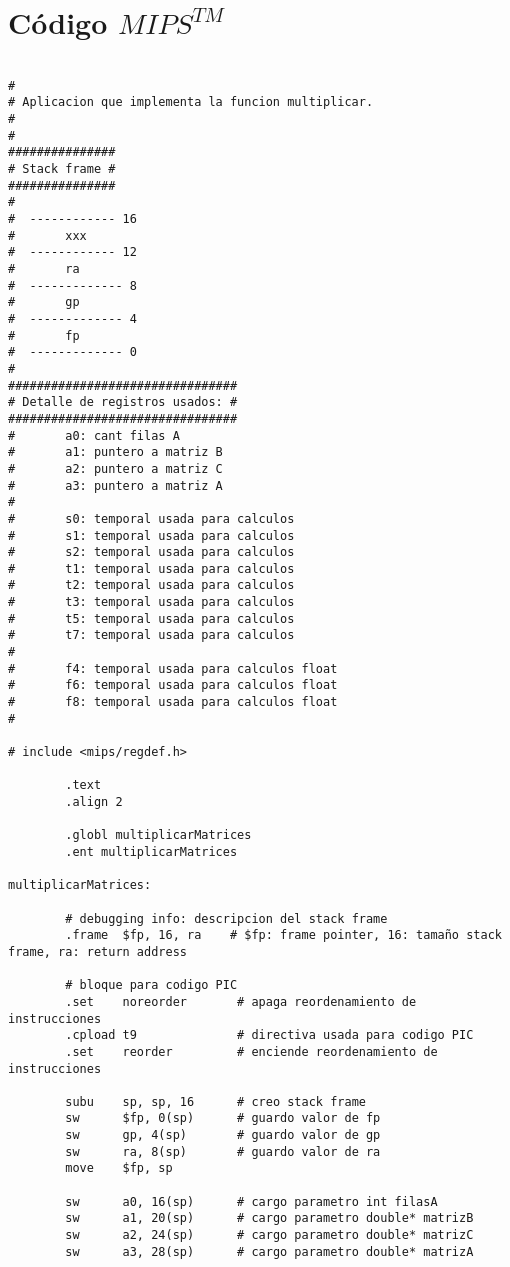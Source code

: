 \documentclass[a4paper,10pt]{article}
\begin{document}
\section{C\'odigo $MIPS^{TM}$}
\begin{lstlisting}

#
# Aplicacion que implementa la funcion multiplicar.
#
#
###############
# Stack frame #
###############
#
#  ------------ 16
#       xxx
#  ------------ 12
#       ra
#  ------------- 8
#       gp
#  ------------- 4
#       fp
#  ------------- 0
#
################################
# Detalle de registros usados: #
################################
#       a0: cant filas A
#       a1: puntero a matriz B
#       a2: puntero a matriz C
#       a3: puntero a matriz A
#
#       s0: temporal usada para calculos
#       s1: temporal usada para calculos
#       s2: temporal usada para calculos
#       t1: temporal usada para calculos
#       t2: temporal usada para calculos
#       t3: temporal usada para calculos
#       t5: temporal usada para calculos
#       t7: temporal usada para calculos
#
#       f4: temporal usada para calculos float
#       f6: temporal usada para calculos float
#       f8: temporal usada para calculos float
#       

# include <mips/regdef.h>

        .text
        .align 2

        .globl multiplicarMatrices
        .ent multiplicarMatrices

multiplicarMatrices:

        # debugging info: descripcion del stack frame
        .frame  $fp, 16, ra    # $fp: frame pointer, 16: tamaño stack frame, ra: return address
        
        # bloque para codigo PIC
        .set    noreorder       # apaga reordenamiento de instrucciones
        .cpload t9              # directiva usada para codigo PIC
        .set    reorder         # enciende reordenamiento de instrucciones

        subu    sp, sp, 16      # creo stack frame
        sw      $fp, 0(sp)      # guardo valor de fp
        sw      gp, 4(sp)       # guardo valor de gp
        sw      ra, 8(sp)       # guardo valor de ra
        move    $fp, sp

        sw      a0, 16(sp)      # cargo parametro int filasA
        sw      a1, 20(sp)      # cargo parametro double* matrizB
        sw      a2, 24(sp)      # cargo parametro double* matrizC
        sw      a3, 28(sp)      # cargo parametro double* matrizA


\end{lstlisting}
\end{document}
